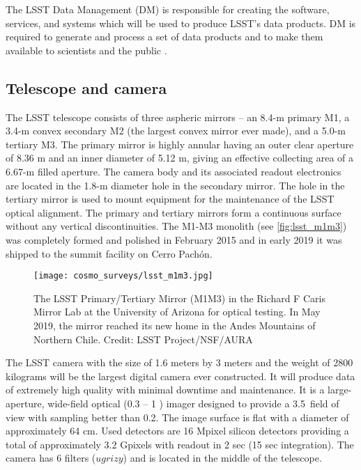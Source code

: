 The LSST Data Management (DM) is responsible for creating the software, services, and systems which will be used to produce LSST's data products. DM is required to generate and process a set of data products and to make them available to scientists and the public \parencite{LSST_DM}.

\subsection{Telescope and camera}
The LSST telescope consists of three aspheric mirrors -- an 8.4-m primary M1, a 3.4-m convex secondary M2 (the largest convex mirror ever made), and a 5.0-m tertiary M3. The primary mirror is highly annular having an outer clear aperture of 8.36 m and an inner diameter of 5.12 m, giving an effective collecting area of a 6.67-m filled aperture. The camera body and its associated readout electronics are located in the 1.8-m diameter hole in the secondary mirror.  The hole in the tertiary mirror is used to mount equipment for the maintenance of the LSST optical alignment. The primary and tertiary mirrors form a continuous surface without any vertical discontinuities. The M1-M3 monolith (see \autoref{fig:lsst_m1m3}) was completely formed and polished in February 2015 and in early 2019 it was shipped to the summit facility on Cerro Pach\'{o}n.
\begin{figure}[htb]
    \centering
    \texttt{[image: cosmo\_surveys/lsst\_m1m3.jpg]}
    \caption{The LSST Primary/Tertiary Mirror (M1M3) in the Richard F Caris Mirror Lab at the University of Arizona for optical testing. In May 2019, the mirror reached its new home in the Andes Mountains of Northern Chile. Credit: LSST Project/NSF/AURA}
    \label{fig:lsst_m1m3}
\end{figure}

The LSST camera with the size of 1.6 meters by 3 meters and the weight of 2800 kilograms will be the largest digital camera ever constructed. It will produce data of extremely high quality with minimal downtime and maintenance. It is a large-aperture, wide-field optical (0.3 -- 1 \um) imager designed to provide a 3.5\textdegree\ field of view with sampling better than 0.2\arcsec. The image surface is flat with a diameter of approximately 64 cm. Used detectors are 16 Mpixel silicon detectors providing a total of approximately 3.2 Gpixels with readout in 2 sec (15 sec integration). The camera has 6 filters ($ugrizy$) and is located in the middle of the telescope.

